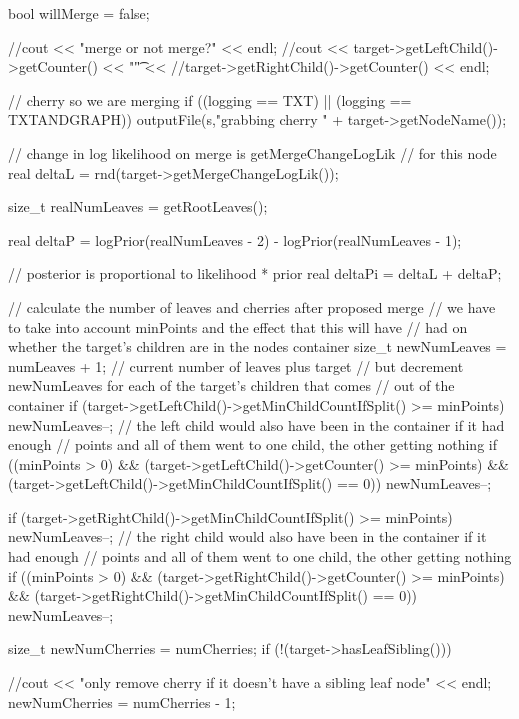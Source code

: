 \begin{DoxyCode}
{
    bool willMerge = false;

  //cout << "merge or not merge?" << endl;
  //cout << target->getLeftChild()->getCounter() << "\t" << 
  //target->getRightChild()->getCounter() << endl;

    // cherry so we are merging
    if ((logging == TXT) || (logging == TXTANDGRAPH))
        outputFile(s,"grabbing cherry " + target->getNodeName());

    // change in log likelihood on merge is getMergeChangeLogLik
    // for this node
    real deltaL = rnd(target->getMergeChangeLogLik());

    size_t realNumLeaves = getRootLeaves();

    real deltaP = logPrior(realNumLeaves - 2) - logPrior(realNumLeaves - 1);

    // posterior is proportional to likelihood * prior
    real deltaPi = deltaL + deltaP;

    // calculate the number of leaves and cherries after proposed merge
    // we have to take into account minPoints and the effect that this will
       have
    // had on whether the target's children are in the nodes container
    size_t newNumLeaves = numLeaves + 1; // current number of leaves plus
       target
    // but decrement newNumLeaves for each of the target's children that comes
    // out of the container
    if (target->getLeftChild()->getMinChildCountIfSplit() >= minPoints) {
        newNumLeaves--;
    }
    // the left child would also have been in the container if it had enough
    // points and all of them went to one child, the other getting nothing
    if ((minPoints > 0)
        && (target->getLeftChild()->getCounter() >= minPoints)
        && (target->getLeftChild()->getMinChildCountIfSplit() == 0)) {
            newNumLeaves--;
    }

    if (target->getRightChild()->getMinChildCountIfSplit() >= minPoints) {
        newNumLeaves--;
    }
    // the right child would also have been in the container if it had enough
    // points and all of them went to one child, the other getting nothing
    if ((minPoints > 0)
        && (target->getRightChild()->getCounter() >= minPoints)
        && (target->getRightChild()->getMinChildCountIfSplit() == 0)) {
            newNumLeaves--;
    }

    size_t newNumCherries = numCherries;
    if (!(target->hasLeafSibling())) { 
     
     //cout << "only remove cherry if it doesn't have a sibling leaf node" <<
       endl;
     newNumCherries = numCherries - 1; }

}
\end{DoxyCode}
